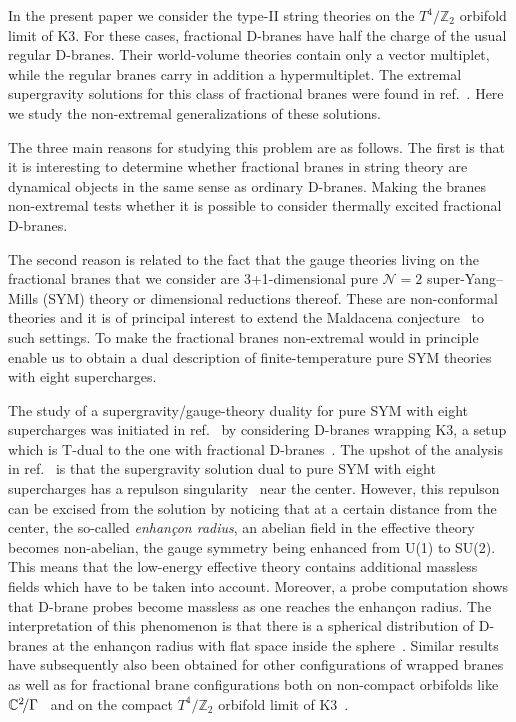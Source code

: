 \documentclass[a4paper,11pt]{article}
\newcommand{\ZZ}{\mathbb{Z}}  \newcommand{\Zint}{\mathbb{Z}}
\begin{document}
In the present paper we consider the type-II string theories on the
$T^4\!/\ZZ_2$ orbifold limit of K3. For these cases, fractional
D-branes have half the charge of the usual regular D-branes. Their
world-volume theories contain only a vector multiplet, while the
regular branes carry in addition a hypermultiplet. The extremal
supergravity solutions for this class of fractional branes were found
in ref.~\cite{Frau:2000gk}. Here we study the non-extremal
generalizations of these solutions.

The three main reasons for studying this problem are as follows. The
first is that it is interesting to determine whether fractional branes
in string theory are dynamical objects in the same sense as ordinary
D-branes. Making the branes non-extremal tests whether it is possible
to consider thermally excited fractional D-branes.

The second reason is related to the fact that the gauge theories
living on the fractional branes that we consider are 3+1-dimensional
pure $\mathcal{N}=2$ super-Yang--Mills (SYM) theory or dimensional
reductions thereof. These are non-conformal theories and it is of
principal interest to extend the Maldacena
conjecture~\cite{Maldacena:1997re,Gubser:1998bc,Witten:1998qj} to
such settings. To make the fractional branes non-extremal would in
principle enable us to obtain a dual description of finite-temperature
pure SYM theories with eight supercharges.

The study of a supergravity/gauge-theory duality for pure SYM with
eight supercharges was initiated in ref.~\cite{Johnson:1999qt} by
considering D-branes wrapping K3, a setup which is T-dual to the one
with fractional D-branes~\cite{Johnson:1999qt,Karch:1998yv,Dasgupta:1999wx}.
The upshot of the analysis in ref.~\cite{Johnson:1999qt} is that the
supergravity solution dual to pure SYM with eight supercharges has a
repulson singularity~\cite{Behrndt:1995tr,Kallosh:1995yz,Cvetic:1995mx}
near the center. However, this repulson can be excised from the solution
by noticing that at a certain distance from the center, the so-called
\emph{enhan\c{c}on radius}, an abelian field in the effective theory
becomes non-abelian, the gauge symmetry being enhanced from U(1) to
SU(2). This means that the low-energy effective theory contains
additional massless fields which have to be taken into account.
Moreover, a probe computation shows that D-brane probes become massless
as one reaches the enhan\c{c}on radius. The interpretation of this
phenomenon is that there is a spherical distribution of D-branes at
the enhan\c{c}on radius with flat space inside the
sphere~\cite{Johnson:1999qt}. Similar results have subsequently also
been obtained for other configurations of wrapped
branes~\cite{Gauntlett:2001ps,Bigazzi:2001aj,DiVecchia:2001uc} as well
as for fractional brane configurations both on non-compact orbifolds like
$\mathbb{C}^2\!/\Gamma$~\cite{Bertolini:2000dk,Polchinski:2000mx,Grana:2001xn,
Bertolini:2001qa, Billo:2001vg,Bain:2001kw} and on the compact
$T^4\!/\ZZ_2$ orbifold limit of K3~\cite{Frau:2000gk}.
\end{document}
